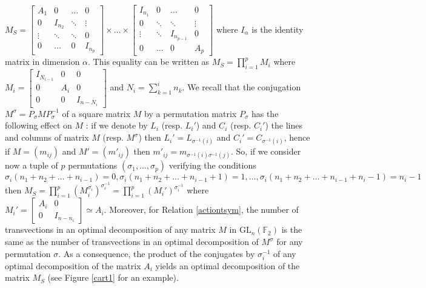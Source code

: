 \documentclass[a4paper,12pt,fleqn]{article}
\newcommand\GL[1][n]{\mathrm{GL}_{#1}(\mathbb{F}_2)}
\begin{document}
  $M_S=\begin{bmatrix}A_{1}&0&\dots&0\\
    0&I_{n_2}&\ddots&\vdots\\
    \vdots&\ddots&\ddots&0\\
    0&\dots&0&I_{n_p}
  \end{bmatrix}
  \times\dots\times
  \begin{bmatrix}I_{n_1}&0&\dots&0\\
    0&\ddots&\ddots&\vdots\\
    \vdots&\ddots&I_{n_{p-1}}&0\\
    0&\dots&0&A_p
  \end{bmatrix}$ where $I_{\alpha}$ is the identity matrix in dimension $\alpha$. This equality can be written as $M_S=\prod_{i=1}^{p}M_{i}$ where $M_i=\begin{bmatrix}I_{N_{i-1}}&0&0\\0&A_i&0\\0&0&I_{n-N_i}\end{bmatrix}$ and $N_i=\sum_{k=1}^in_k$.
   We recall that the conjugation $M^{\sigma}=P_{\sigma}MP_{\sigma}^{-1}$ of a square matrix $M$ by a permutation matrix  $P_{\sigma}$ has the following effect on $M$ :  if we denote by $L_i$ (resp. $L_i'$) and $C_i$ (resp. $C_i'$) the lines and columns of matrix $M$
   (resp. $M^{\sigma}$) then $L_i'=L_{\sigma^{-1}(i)}$ and $C_i'=C_{\sigma^{-1}(i)}$, hence if $M=(m_{ij})$ and $M'=(m'_{ij})$ then $m'_{ij}=m_{\sigma^{-1}(i)\sigma^{-1}(j)}$.
   So, if we consider now a tuple of $p$ permutations $(\sigma_1,\dots,\sigma_p)$ verifying the conditions
  $\sigma_i(n_1+n_2+\dots+n_{i-1})=0,\sigma_i(n_1+n_2+\dots+n_{i-1}+1)=1,\dots,\sigma_i(n_1+n_2+\dots +n_{i-1}+n_i-1)=n_{i}-1$ then 
$M_S=\prod_{i=1}^{p}{\left(M_{i}^{\sigma_i}\right)}^{\sigma_i^{-1}}=\prod_{i=1}^{p}\left(M_i'\right)^{\sigma_i^{-1}}$
where $M_i'=\begin{bmatrix}A_i&0\\0&I_{n-n_i}\end{bmatrix}\simeq A_i$. Moreover, for Relation \eqref{actiontsym}, the number of transvections in an optimal decomposition of any matrix $M$ in $\GL$ is the same as the number of transvections in an optimal decomposition of $M^{\sigma}$ for any permutation $\sigma$. 
 As a consequence, the product of the conjugates by $\sigma_i^{-1}$ of any optimal decomposition of the matrix $A_i$  yields an optimal decomposition of the matrix $M_S$   (see Figure \ref{cart1} for an example).
 
\end{document}
